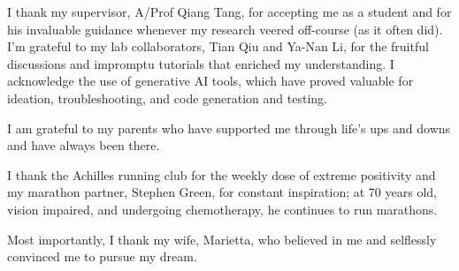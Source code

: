 I thank my supervisor, A/Prof Qiang Tang, for accepting me as a student and for his invaluable guidance whenever my research veered off-course (as it often did). I'm grateful to my lab collaborators, Tian Qiu and Ya-Nan Li, for the fruitful discussions and impromptu tutorials that enriched my understanding. I acknowledge the use of generative AI tools, which have proved valuable for ideation, troubleshooting, and code generation and testing.

I am grateful to my parents who have supported me through life's ups and downs and have always been there.

I thank the Achilles running club for the weekly dose of extreme positivity and my marathon partner, Stephen Green, for constant inspiration; at 70 years old, vision impaired, and undergoing chemotherapy, he continues to run marathons. 


Most importantly, I thank my wife, Marietta, who believed in me and selflessly convinced me to pursue my dream.